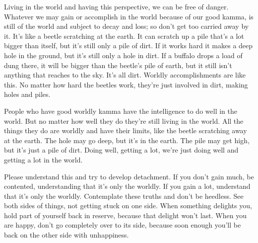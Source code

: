 Living in the world and having this perspective, we can be free of danger. Whatever we may gain or accomplish in the world because of our good kamma, is still of the world and subject to decay and loss; so don't get too carried away by it. It's like a beetle scratching at the earth. It can scratch up a pile that's a lot bigger than itself, but it's still only a pile of dirt. If it works hard it makes a deep hole in the ground, but it's still only a hole in dirt. If a buffalo drops a load of dung there, it will be bigger than the beetle's pile of earth, but it still isn't anything that reaches to the sky. It's all dirt. Worldly accomplishments are like this. No matter how hard the beetles work, they're just involved in dirt, making holes and piles.

People who have good worldly kamma have the intelligence to do well in the world. But no matter how well they do they're still living in the world. All the things they do are worldly and have their limits, like the beetle scratching away at the earth. The hole may go deep, but it's in the earth. The pile may get high, but it's just a pile of dirt. Doing well, getting a lot, we're just doing well and getting a lot in the world.

Please understand this and try to develop detachment. If you don't gain much, be contented, understanding that it's only the worldly. If you gain a lot, understand that it's only the worldly. Contemplate these truths and don't be heedless. See both sides of things, not getting stuck on one side. When something delights you, hold part of yourself back in reserve, because that delight won't last. When you are happy, don't go completely over to its side, because soon enough you'll be back on the other side with unhappiness.
